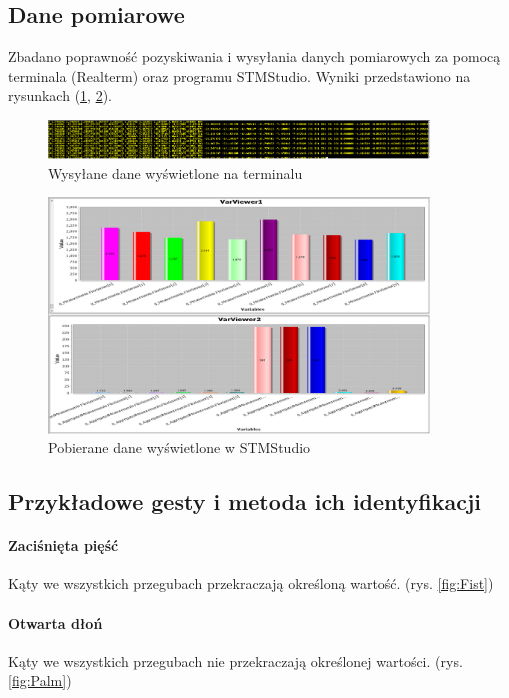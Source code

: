 \documentclass[12pt,a4paper]{article}
\begin{document}
\subsection{Dane pomiarowe}
Zbadano poprawność pozyskiwania i wysyłania danych pomiarowych za pomocą terminala (Realterm) oraz programu STMStudio. Wyniki przedstawiono na rysunkach (\ref{fig:term}, \ref{fig:stmstudio}).\\
\begin{figure}
\centering
\includegraphics[width=0.9\textwidth]{./images/terminal.PNG}
\caption{Wysyłane dane wyświetlone na terminalu \label{fig:term}}
\end{figure}
\begin{figure}
\centering
\includegraphics[width=0.9\textwidth]{./images/STMStudio.PNG}
\caption{Pobierane dane wyświetlone w STMStudio\label{fig:stmstudio}}
\end{figure}

\subsection{Przykładowe gesty i metoda ich identyfikacji}
\paragraph{Zaciśnięta pięść}
Kąty we wszystkich przegubach przekraczają określoną wartość. (rys. \ref{fig:Fist})
\paragraph{Otwarta dłoń}
Kąty we wszystkich przegubach nie przekraczają określonej wartości. (rys. \ref{fig:Palm})
\end{document}
